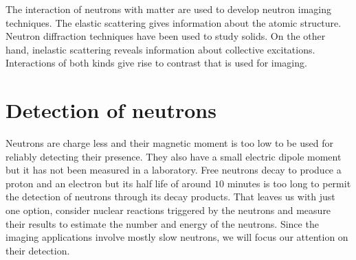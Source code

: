 \documentclass{article}
\numberwithin{equation}{section}
\begin{document}
The interaction of neutrons with matter are used to develop neutron imaging
techniques. The elastic scattering gives information about the atomic 
structure. Neutron diffraction techniques have been used to study solids. On
the other hand, inelastic scattering reveals information about collective
excitations. Interactions of both kinds give rise to contrast that is used
for imaging.

\section{Detection of neutrons}\label{s5}
Neutrons are charge less and their magnetic moment is too low to be used for
reliably detecting their presence. They also have a small electric dipole 
moment but it has not been measured in a laboratory. Free neutrons decay to
produce a proton and an electron but its half life of around $10$ minutes is
too long to permit the detection of neutrons through its decay products. That
leaves us with just one option, consider nuclear reactions triggered by the
neutrons and measure their results to estimate the number and energy of the
neutrons. Since the imaging applications involve mostly slow neutrons, we will
focus our attention on their detection. 
\end{document}
